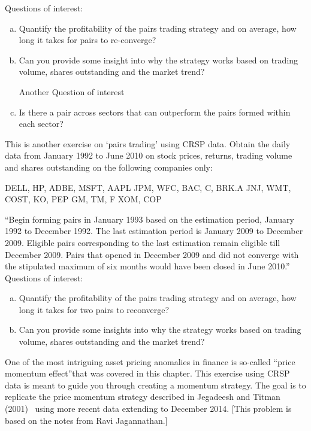 \noindent Questions of interest:
	\begin{enumerate}[(a)]
	\item Quantify the profitability of the pairs trading strategy and on average, how long it takes for pairs to re-converge?
	\item Can you provide some insight into why the strategy works based on trading volume, shares outstanding and the market trend?


Another Question of interest
	\item Is there a pair across sectors that can outperform the pairs formed within each sector? \\
	\end{enumerate}


\prob  This is another exercise on `pairs trading' using CRSP data. Obtain the daily data from January 1992 to June 2010 on stock prices, returns, trading volume and shares outstanding on the following companies only:

\indent DELL, HP, ADBE, MSFT, AAPL\hfill \break
\indent JPM, WFC, BAC, C, BRK.A\hfill \break
\indent JNJ, WMT, COST, KO, PEP\hfill \break
\indent GM, TM, F\hfill \break
\indent XOM, COP 

``Begin forming pairs in January 1993 based on the estimation period, January 1992 to December 1992. The last estimation period is January 2009 to December 2009. Eligible pairs corresponding to the last estimation remain eligible till December 2009. Pairs that opened in December 2009 and did not converge with the stipulated maximum of six months would have been closed in June 2010.'' \\

\noindent Questions of interest:
	\begin{enumerate}[(a)]
	\item Quantify the profitability of the pairs trading strategy and on average, how long it takes for two pairs to reconverge?
	\item Can you provide some insights into why the strategy works based on trading volume, shares outstanding and the market trend? \\
	\end{enumerate}


\prob One of the most intriguing asset pricing anomalies in finance is so-called \textquotedblleft price momentum effect\textquotedblright that was covered in this chapter. This exercise using CRSP data is meant to guide you through creating a momentum strategy. The goal is to replicate the price momentum strategy described in Jegadeesh and Titman (2001)~\cite{JeTi} using more recent data extending to December 2014. [This problem is based on the notes from Ravi Jagannathan.] \\

